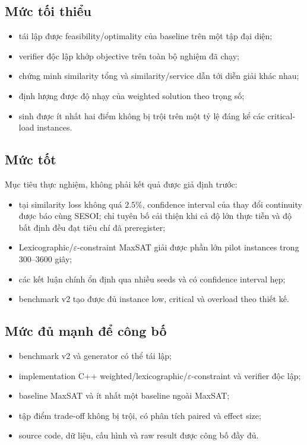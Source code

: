 \documentclass[12pt,a4paper]{article}
\begin{document}
\subsection{Mức tối thiểu}

\begin{itemize}
  \item tái lập được feasibility/optimality của baseline trên một tập đại diện;
  \item verifier độc lập khớp objective trên toàn bộ nghiệm đã chạy;
  \item chứng minh similarity tổng và similarity/service dẫn tới diễn giải khác nhau;
  \item định lượng được độ nhạy của weighted solution theo trọng số;
  \item sinh được ít nhất hai điểm không bị trội trên một tỷ lệ đáng kể các
        critical-load instances.
\end{itemize}

\subsection{Mức tốt}

Mục tiêu thực nghiệm, không phải kết quả được giả định trước:
\begin{itemize}
  \item tại similarity loss không quá $2.5\%$, confidence interval của thay đổi
        continuity được báo cùng SESOI; chỉ tuyên bố cải thiện khi cả độ lớn
        thực tiễn và độ bất định đều đạt tiêu chí đã preregister;
  \item Lexicographic/$\varepsilon$-constraint MaxSAT giải được phần lớn pilot instances trong
        300--3600 giây;
  \item các kết luận chính ổn định qua nhiều seeds và có confidence interval hẹp;
  \item benchmark v2 tạo được đủ instance low, critical và overload theo thiết kế.
\end{itemize}

\subsection{Mức đủ mạnh để công bố}

\begin{itemize}
  \item benchmark v2 và generator có thể tái lập;
  \item implementation C++ weighted/lexicographic/$\varepsilon$-constraint
        và verifier độc lập;
  \item baseline MaxSAT và ít nhất một baseline ngoài MaxSAT;
  \item tập điểm trade-off không bị trội, có phân tích paired và effect size;
  \item source code, dữ liệu, cấu hình và raw result được công bố đầy đủ.
\end{itemize}
\end{document}
